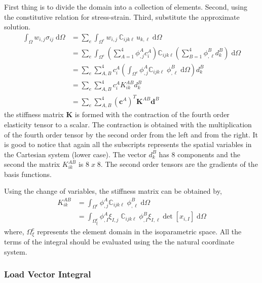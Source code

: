 \documentclass[11pt, a4paper]{article}
\numberwithin{equation}{section}
\begin{document}
First thing is to divide the domain into a collection of elements. Second, using the constitutive relation for stress-strain. Third, substitute the approximate solution.
\begin{align*}
\int_\Omega w_{i,j}  \sigma_{ij}\; \mathrm{d}\Omega &=
\sum_e \int_{\Omega^e} w_{i,j} \, \mathbb{C}_{ijk\ell}\, u_{k,\ell} \; \mathrm{d}\Omega
\\
&= 
\sum_e \int_{\Omega^e} \left( \sum_{A=1}^4 \phi^A_{,j} c_i^A \right)   \mathbb{C}_{ijk\ell} \left( \sum_{B=1}^4 \phi^B_{,\ell} d_k^B \right) \; \mathrm{d}\Omega
\\
&=
 \sum_e\sum_{A,B}^4  c_i^A \left( \int_{\Omega^e} \phi^A_{,j} \mathbb{C}_{ijk\ell} \;\phi^B_{,\ell}\; \mathrm{d} \Omega \right) d_k^B  \\
&= \sum_e\sum_{A,B}^4 c_i^A K_{ik}^{AB} d^B_k \\
&= \sum_e\sum_{A,B}^4 (\mathbf{c}^{A})^T \mathbf{K}^{AB} \mathbf{d}^B
\end{align*}
the stiffness matrix $\mathbf{K}$ is formed with the contraction of the fourth order elasticity tensor to a scalar. The contraction is obtained with the multiplication of the fourth order tensor by the second order from the left and from the right. It is good to notice that again all the subscripts represents the spatial variables in the Cartesian system (lower case). The vector $d_k^B$ has 8 components and the second the matrix $K_{ik}^{AB}$ is $8\;x\;8$. The second order tensors are the gradients of the basis functions. 

Using the change of variables, the stiffness matrix can be obtained by,
\begin{align*}
K_{ik}^{AB}
&=
\int_{\Omega^e} \phi^A_{,j} \mathbb{C}_{ijk\ell} \;\phi^B_{,\ell} \; \mathrm{d} \Omega \\
&= 
\int_{\Omega^e_\xi} \phi^A_{,I} \xi_{I,j}\; \mathbb{C}_{ijk\ell} \; \phi^B_{,I} \xi_{I,\ell} \det[x_{i,I}] \; \mathrm{d} \Omega
\end{align*}
where, $\Omega_{\xi}^e$ represents the element domain in the isoparametric space. All the terms of the integral should be evaluated using the the natural coordinate system.

\subsubsection{Load Vector Integral}
\end{document}
